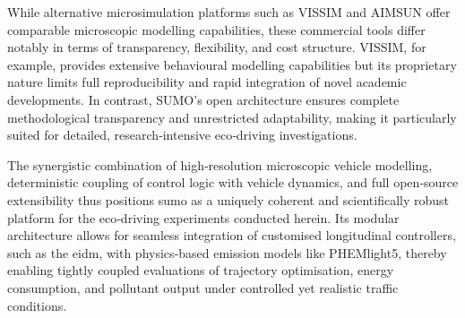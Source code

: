 While alternative microsimulation platforms such as VISSIM and AIMSUN offer comparable microscopic modelling capabilities, these commercial tools differ notably in terms of transparency, flexibility, and cost structure. VISSIM, for example, provides extensive behavioural modelling capabilities but its proprietary nature limits full reproducibility and rapid integration of novel academic developments. In contrast, SUMO's open architecture ensures complete methodological transparency and unrestricted adaptability, making it particularly suited for detailed, research‐intensive eco‐driving investigations.

The synergistic combination of high‐resolution microscopic vehicle modelling, deterministic coupling of control logic with vehicle dynamics, and full open‐source extensibility thus positions \ac{sumo} as a uniquely coherent and scientifically robust platform for the eco‐driving experiments conducted herein. Its modular architecture allows for seamless integration of customised longitudinal controllers, such as the \ac{eidm}, with physics‐based emission models like PHEMlight5, thereby enabling tightly coupled evaluations of trajectory optimisation, energy consumption, and pollutant output under controlled yet realistic traffic conditions.
